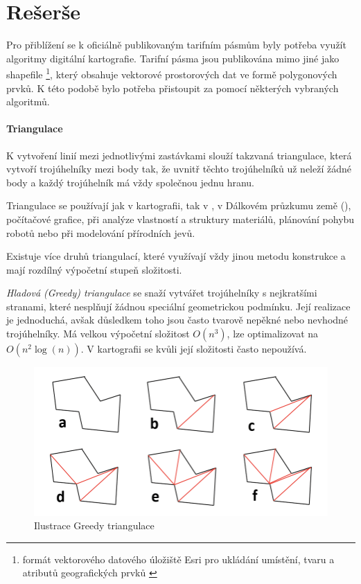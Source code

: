 \chapter{Rešerše}
\label{0-reserse}

Pro přiblížení se k oficiálně publikovaným tarifním pásmům byly potřeba využít algoritmy
digitální kartografie. Tarifní pásma jsou publikována mimo jiné jako shapefile 
\footnote{formát vektorového datového úložiště Esri pro ukládání umístění,
tvaru a atributů geografických prvků \cite{shapefile}}, který obsahuje
vektorové prostorových dat ve formě polygonových prvků. K této podobě bylo potřeba přistoupit
za pomocí některých vybraných algoritmů.

\subsubsection{Triangulace}
\label{triangulace}

K vytvoření linií mezi jednotlivými zastávkami slouží takzvaná triangulace, 
která vytvoří troj\-úhelníky mezi body tak, že uvnitř těchto trojúhelníků  
už neleží žádné body a každý trojúhelník má vždy společnou jednu hranu. 

Triangulace se používají jak v kartografii, tak v , v Dálkovém průzkumu země (),
počítačové grafice, při analýze vlastností a struktury materiálů, plánování pohybu robotů
nebo při modelování přírodních jevů. \cite{bayer-delaunay}

Existuje více druhů triangulací, které využívají vždy jinou metodu konstrukce
a mají rozdílný výpočetní stupeň složitosti. 

\textit{Hladová (Greedy) triangulace} se snaží vytvářet trojúhelníky s nejkratšími stranami,
které nesplňují žádnou speciální geometrickou podmínku. Její realizace je jednoduchá,
avšak důsledkem toho jsou často tvarově nepěkné nebo nevhodné trojúhelníky. Má velkou výpočetní
složitost \(O(n^3)\), lze optimalizovat na \(O(n^2 \log(n))\). V kartografii se
kvůli její složitosti často nepoužívá. \cite{vanicek}

\begin{figure}[H] \centering
    \includegraphics[width=400pt]{./pictures/triangulace-greedy.png}
    \caption[Ilustrace Greedy triangulace]{Ilustrace Greedy triangulace \cite{triangulace-greedy}}
	\label{fig:triangulace-greedy}              
\end{figure}

